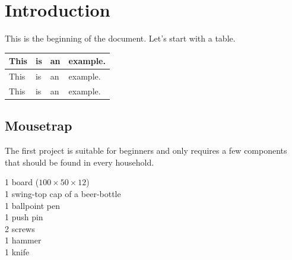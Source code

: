 \documentclass[
    fontsize=11,
    paper=letter,
    twoside=true,  %
    open=right,
    chapterprefix=true,  %
    appendixprefix=true,  %
    numbers=noendperiod,  %
    toc=flat,  %
    usegeometry=true  %
  ]{scrreprt}
\begin{document}
\listoffigures
\listoftables




\chapter{Introduction}

This is the beginning of the document. Let's start with a table.
\begin{table}
    \centering
    \begin{tabular}{llll}
        This & is & an & example.\\ \hline
        This & is & an & example.\\
        This & is & an & example.
    \end{tabular}
\end{table}

\section{Mousetrap}
The first project is suitable for beginners and only requires a few components that should be found in every household.


\begin{flushleft}
1 board ($100\times 50 \times 12$)\\
1 swing-top cap of a beer-bottle\\
1 ballpoint pen\\
1 push pin\\
2 screws\\
1 hammer\\
1 knife
\end{flushleft}
\end{document}
